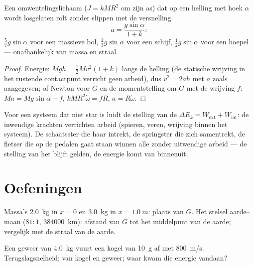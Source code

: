 \begin{proposition}\label{prop:b1:systems-of-points:rollingincline}
Een omwentelingslichaam ($J = kMR^2$ om zijn as) dat op een helling met
hoek $\alpha$ wordt losgelaten rolt zonder slippen met de versnelling
\[
a = \frac{g\sin\alpha}{1 + k} :
\]
$\tfrac57 g\sin\alpha$ voor een massieve bol, $\tfrac23 g\sin\alpha$ voor een schijf,
$\tfrac12 g\sin\alpha$ voor een hoepel --- onafhankelijk van massa en straal.
\end{proposition}

\begin{proof}
Energie: $Mgh = \tfrac12 Mv^2(1 + k)$ langs de helling (de statische wrijving
in het rustende contactpunt verricht geen arbeid), dus $v^2 = 2ah$ met $a$ zoals
aangegeven; of Newton voor $G$ en de momentstelling om $G$ met de
wrijving $f$: $Ma = Mg\sin\alpha - f$, $kMR^2\dot\omega = fR$, $a = R\dot\omega$.
\end{proof}

\begin{remark}\label{rem:b1:systems-of-points:deformable}
Voor een systeem dat niet star is luidt de stelling van de 
$\Delta E_k = W_{\mathrm{ext}} + W_{\mathrm{int}}$: de inwendige krachten
verrichten arbeid (spieren, veren, wrijving binnen het systeem). De schaatsster
die haar  intrekt, de springster die zich samentrekt, de fietser die op de
pedalen gaat staan winnen alle  zonder uitwendige arbeid --- de
stelling van het  blijft gelden, de energie komt van binnenuit.
\end{remark}

\section{Oefeningen}

\begin{exercise}[$\star$]\label{exo:b1:systems-of-points:1}
Massa's \qty{2.0}{kg} in $x = 0$ en \qty{3.0}{kg} in $x = \qty{1.0}{m}$:
plaats van $G$. Het stelsel aarde--maan ($81:1$, \qty{384000}{km}):
afstand van $G$ tot het middelpunt van de aarde; vergelijk met de straal
van de aarde.
\end{exercise}

\begin{exercise}[$\star$]\label{exo:b1:systems-of-points:2}
Een geweer van \qty{4.0}{kg} vuurt een kogel van \qty{10}{g} af met \qty{800}{m/s}.
Terugslagsnelheid;  van kogel en geweer; waar kwam die energie
vandaan?
\end{exercise}

